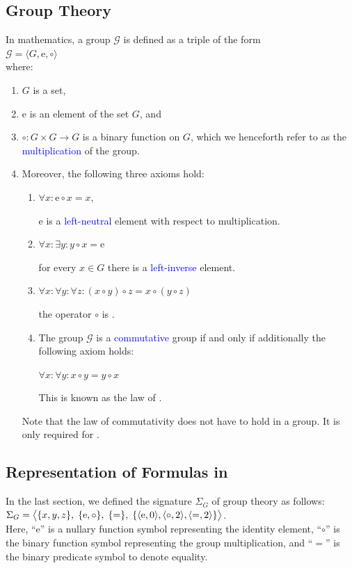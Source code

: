 \subsection{Group Theory}
In mathematics, a group $\mathcal{G}$  is defined as a triple of the form
\\[0.2cm]
\hspace*{1.3cm}
$\mathcal{G} = \langle G, \mathrm{e}, \circ \rangle$
\\[0.2cm]
where:
\begin{enumerate}
\item $G$ is a set,
\item $\mathrm{e}$ is an element of the set $G$, and
\item $\circ: G \times G \rightarrow G$ is a binary function on $G$, which we henceforth refer to as the
      \textcolor{blue}{multiplication} of the group.
\item Moreover, the following three axioms hold:
      \begin{enumerate}
      \item $\forall x: \mathrm{e} \circ x = x$,
        
            $\mathrm{e}$ is a \textcolor{blue}{left-neutral} element with respect to multiplication.
      \item $\forall x: \exists{y}: y \circ x = \mathrm{e}$

            for every $x \in G$ there is a \textcolor{blue}{left-inverse} element.
      \item $\forall x: \forall y: \forall z: (x \circ y) \circ z = x \circ (y \circ z)$

            the operator $\circ$ is .

      \item The group $\mathcal{G}$ is a \textcolor{blue}{commutative} group if and only if additionally the
            following axiom holds: 
        
            $\forall x: \forall y: x \circ y = y \circ x$

            This is known as the law of .
            \eox
      \end{enumerate}
      Note that the law of commutativity does not have to hold in a group.  It is only required for
      . 
\end{enumerate}

\subsection{Representation of Formulas in \texorpdfstring{\Fsharp}{F\#}}
In the last section, we defined the signature $\Sigma_G$ of
group theory as follows:
\\[0.2cm]
\hspace*{1.3cm}
$\Sigma_G = 
   \bigl\langle \{x,y,z\},\; \{\mathrm{e},\circ\},\; \{=\},\; \{ \pair(\mathrm{e},0), \pair(\circ,2), \pair(=,2) \} \bigr\rangle 
$.
\\[0.2cm]
Here, ``$\mathrm{e}$'' is a nullary function symbol representing the identity element, ``$\circ$'' is
the binary function symbol representing the group multiplication, and ``$=$'' is the binary predicate symbol to 
denote equality. 

